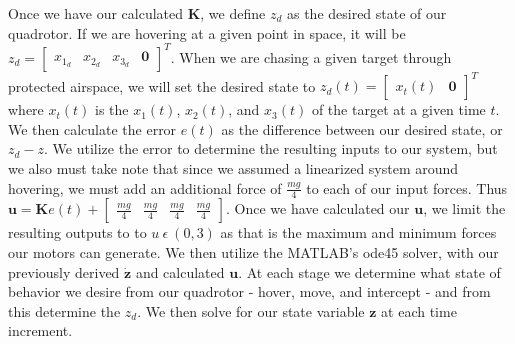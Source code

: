 \documentclass{article}
\begin{document}
\begin{multicols}{2}
Once we have our calculated $\boldsymbol{K}$, we define $z_d$ as the desired state of our quadrotor. If we are hovering  
at a given point in space, it will be $z_d=\begin{bmatrix} x_{1_d} & x_{2_d} & x_{3_d} & \boldsymbol{0} 
\end{bmatrix}^T$. When we are chasing a given target through protected airspace, we will set the desired state to 
$z_d(t)=\begin{bmatrix} x_t(t) & \boldsymbol{0} \end{bmatrix}^T$ where $x_t(t)$ is the $x_1(t)$, $x_2(t)$, and $x_3(t)$ of the target at a given 
time $t$. We then calculate the error $e(t)$ as the difference between our desired state, or $z_d - z$. We utilize the error to 
determine the resulting inputs to our system, but we also must take note that since we assumed a linearized system around 
hovering, we must add an additional force of $\frac{mg}{4}$ to each of our input forces. Thus $\boldsymbol{u}= \boldsymbol{K}e(t) + 
\begin{bmatrix}\frac{mg}{4} & \frac{mg}{4} & \frac{mg}{4} & \frac{mg}{4}\end{bmatrix}$. 
Once we have calculated our $\boldsymbol{u}$, we limit the resulting outputs to to $u\  \epsilon\  (0, 3)$ as that is the maximum and 
minimum forces our motors can generate.
We then utilize the MATLAB's ode45 solver, with our previously derived $\boldsymbol{\dot{z}}$ and calculated $
\boldsymbol{u}$. At each stage we determine what state of behavior we desire from our quadrotor - hover, move, and intercept - 
and from this determine the $z_d$. We then solve for our state variable $\boldsymbol{z}$ at each time increment.

\end{multicols}
\end{document}

